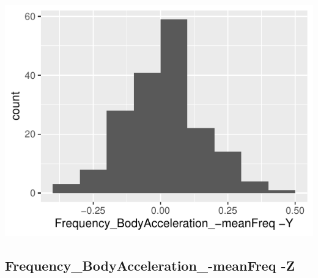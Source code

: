 \documentclass[
]{article}
\begin{document}
\begin{minipage}{0.25 \textwidth}

\includegraphics{codebook_tidydatasub_files/figure-latex/Var-50-Frequency-BodyAcceleration--meanFreq--Y-1.pdf}

\end{minipage}

\noindent\makebox[\linewidth]{\rule{\textwidth}{0.4pt}}

\hypertarget{frequency_bodyacceleration_-meanfreq--z}{%
\subsection{Frequency\_BodyAcceleration\_-meanFreq
-Z}\label{frequency_bodyacceleration_-meanfreq--z}}
\end{document}
